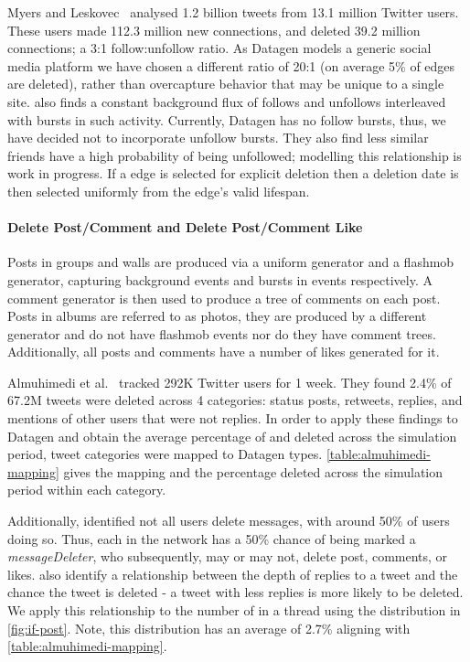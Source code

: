 Myers and Leskovec~\cite{DBLP:conf/www/MyersL14} analysed 1.2 billion tweets from 13.1 million Twitter users.
These users made 112.3 million new connections, and deleted 39.2 million connections; a 3:1 follow:unfollow ratio.
As Datagen models a generic social media platform we have chosen a different ratio of 20:1
(on average 5\% of \tKnows edges are deleted), rather than overcapture behavior that may be unique to a single site.
\cite{DBLP:conf/www/MyersL14} also finds a constant background flux of follows and unfollows interleaved with bursts in such activity.
Currently, Datagen has no follow bursts, thus, we have decided not to incorporate unfollow bursts.
They also find less similar friends have a high probability of being unfollowed; modelling this relationship is work in progress.
If a \tKnows edge is selected for explicit deletion then a deletion date is then selected uniformly from the edge's valid lifespan.

\paragraph{Delete Post/Comment and Delete Post/Comment Like}

Posts in groups and walls are produced via a uniform generator and a flashmob generator, capturing background events and bursts in
events respectively.
A comment generator is then used to produce a tree of comments on each post.
Posts in albums are referred to as photos, they are produced by a different generator and do not have flashmob events nor do they have comment trees.
Additionally, all posts and comments have a number of likes generated for it.

Almuhimedi et al.~\cite{DBLP:conf/cscw/AlmuhimediWLSA13} tracked 292K Twitter users for 1 week.
They found 2.4\% of 67.2M tweets were deleted across 4 categories: status posts, retweets, replies, and mentions of other users that
were not replies.
In order to apply these findings to Datagen and obtain the average percentage of \tMessages and \tLikes deleted across the simulation
period, tweet categories were mapped to Datagen \tMessage types.
\autoref{table:almuhimedi-mapping} gives the mapping and the percentage deleted across the simulation period within each category.



Additionally, \cite{DBLP:conf/cscw/AlmuhimediWLSA13} identified not all users delete messages, with around 50\% of users doing so.
Thus, each \tPerson in the network has a 50\% chance of being marked a \emph{messageDeleter}, who subsequently, may or may not, delete post, comments, or likes.
\cite{DBLP:conf/cscw/AlmuhimediWLSA13} also identify a relationship between the depth of replies to a tweet and the chance the tweet
is deleted - a tweet with less replies is more likely to be deleted.
We apply this relationship to the number of  \tComments in a \tPosts thread using the distribution in \autoref{fig:if-post}.
Note, this distribution has an average of 2.7\% aligning with \autoref{table:almuhimedi-mapping}.

